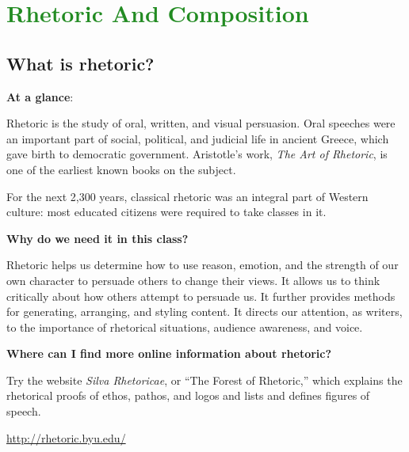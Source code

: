 
\section{\textcolor{ForestGreen}{Rhetoric And Composition}}


\subsection{What is rhetoric?}

\textbf{At a glance}: 

Rhetoric is the study of oral, written, and visual persuasion. Oral speeches were an important part of social, political, and judicial life in ancient Greece, which gave birth to democratic government. Aristotle's work, \emph{The Art of Rhetoric}, is one of the earliest known books on the subject.

 
For the next 2,300 years, classical rhetoric was an integral part of Western culture: most educated citizens were required to take classes in it.
 
\textbf{Why do we need it in this class?} 

Rhetoric helps us determine how to use reason, emotion, and the strength of our own character to persuade others to change their views. It allows us to think critically about how others attempt to persuade us. It further provides methods for generating, arranging, and styling content. It directs our attention, as writers, to the importance of rhetorical situations, audience awareness, and voice.

\textbf{Where can I find more online information about rhetoric?}

Try the website \emph{Silva Rhetoricae}, or ``The Forest of Rhetoric,'' which explains the rhetorical proofs of ethos, pathos, and logos and lists and defines figures of speech.

\url{http://rhetoric.byu.edu/} 
